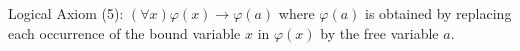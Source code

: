 Logical Axiom (5): $(\forall x)\varphi(x) \rightarrow \varphi(a)$ where $\varphi(a)$ is obtained by replacing each occurrence of the bound variable $x$ in $\varphi(x)$ by the free variable $a$.
